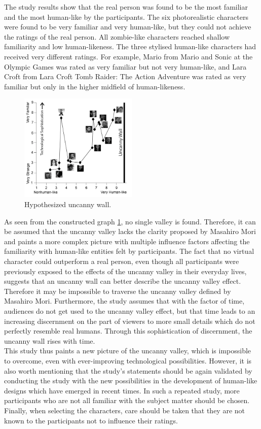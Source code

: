 The study results show that the real person was found to be the most familiar and the most human-like by the participants. The six photorealistic characters were found to be very familiar and very human-like, but they could not achieve the ratings of the real person. All zombie-like characters reached shallow familiarity and low human-likeness. 
The three stylised human-like characters had received very different ratings. For example, Mario from Mario and Sonic at the Olympic Games was rated as very familiar but not very human-like, and Lara Croft from Lara Croft Tomb Raider: The Action Adventure was rated as very familiar but only in the higher midfield of human-likeness. 
\newpage
\begin{figure} %
    \centering
    \includegraphics[width=0.5\textwidth]{graphics/uncanny_wall_graph.png}
    \caption{Hypothesized uncanny wall.}
    \label{fig:uncannyWallGraph}
\end{figure}
As seen from the constructed graph \ref{fig:uncannyWallGraph}, no single valley is found.
Therefore, it can be assumed that the uncanny valley lacks the clarity proposed by Masahiro Mori and paints a more complex picture with multiple influence factors affecting the familiarity with human-like entities felt by participants. The fact that no virtual character could outperform a real person, even though all participants were previously exposed to the effects of the uncanny valley in their everyday lives, suggests that an uncanny wall can better describe the uncanny valley effect. Therefore it may be impossible to traverse the uncanny valley defined by Masahiro Mori. Furthermore, the study assumes that with the factor of time, audiences do not get used to the uncanny valley effect, but that time leads to an increasing discernment on the part of viewers to more small details which do not perfectly resemble real humans. Through this sophistication of discernment, the uncanny wall rises with time.\\
This study thus paints a new picture of the uncanny valley, which is impossible to overcome, even with ever-improving technological possibilities. However, it is also worth mentioning that the study's statements should be again validated by conducting the study with the new possibilities in the development of human-like designs which have emerged in recent times. In such a repeated study, more participants who are not all familiar with the subject matter should be chosen. Finally, when selecting the characters, care should be taken that they are not known to the participants not to influence their ratings.